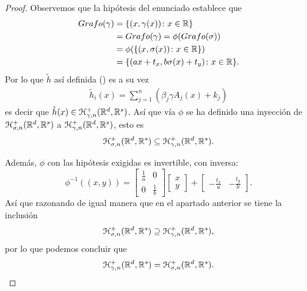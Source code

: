 \begin{aportacionOriginal}
\begin{proof}
    Observemos que la 
    hipótesis del enunciado 
    establece que
    \begin{align}
        Grafo(\gamma) &= \{ (x, \gamma(x)) \colon x \in \mathbb{R} \} 
        \\
        & = 
        Grafo(\gamma)  = \phi(Grafo(\sigma)) 
        \\
        & = 
        \phi( \{ (x, \sigma(x)) \colon x \in \mathbb{R} \})
        \\
        &=
        \{ (a x + t_x, b \sigma(x) + t_y) \colon x \in \mathbb{R} \}.
    \end{align}
    Por lo que $\tilde{h}$ así definida ()
    es a su vez 
    \begin{align}
        \tilde{h}_i(x) 
        = \sum^n_{j=1}(\beta_{j}  \gamma A_j(x)+ k_j)
    \end{align}
     es decir que $\tilde{h}(x) \in \mathcal{H}^+_{\gamma, n}(\mathbb{R}^d, \mathbb{R}^s)$. 
    Así que vía $\phi$ se ha definido una inyección 
    de $\mathcal{H}^+_{\sigma, n}(\mathbb{R}^d, \mathbb{R}^s)$ a 
    $\mathcal{H}^+_{\gamma, n}(\mathbb{R}^d, \mathbb{R}^s)$, 
    esto es 
    \begin{equation}
        \mathcal{H}^+_{\sigma, n}(\mathbb{R}^d, \mathbb{R}^s)
        \subseteq
        \mathcal{H}^+_{\gamma, n}(\mathbb{R}^d, \mathbb{R}^s).  
    \end{equation}

    Además, $\phi$ con las hipótesis exigidas es
    invertible, con inversa: 
    \begin{equation}
        \phi^{-1}((x,y)) =  
        \begin{bmatrix}
            \frac{1}{a} & 0 \\
             0& \frac{1}{b} 
        \end{bmatrix}
        \begin{bmatrix}
            x \\
            y
        \end{bmatrix}
        +
        \begin{bmatrix}
            - \frac{t_x}{a}  &  - \frac{t_y}{b}
        \end{bmatrix}.
    \end{equation}
    Así que razonando de igual manera que en el 
    apartado anterior se tiene la inclusión
    \begin{equation}
        \mathcal{H}^+_{\sigma, n}(\mathbb{R}^d, \mathbb{R}^s)
        \supseteq
        \mathcal{H}^+_{\gamma, n}(\mathbb{R}^d, \mathbb{R}^s),  
    \end{equation}
    por lo que podemos concluir que 
    \begin{equation*}
        \mathcal{H}^+_{\gamma, n}(\mathbb{R}^d, \mathbb{R}^s) 
        = 
        \mathcal{H}^+_{\sigma, n}(\mathbb{R}^d, \mathbb{R}^s).
    \end{equation*}
    

\end{proof}
\end{aportacionOriginal}
